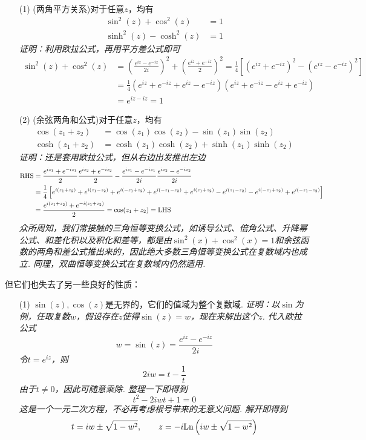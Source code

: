 \documentclass[UTF8]{ctexart}
\newcommand{\trm}[1]{{\rm #1}}
\begin{document}
\begin{itemize}
    \item [(1)] (两角平方关系)对于任意\(z\)，均有
    \begin{align*}
        \sin^2(z) + \cos^2(z) &= 1 \\
        \sinh^2(z) - \cosh^2(z) &= 1
    \end{align*}
    \textit{
        证明：利用欧拉公式，再用平方差公式即可
    }
    \begin{align*}
        \sin^2(z)+\cos^2(z) &= \left(\frac{e^{iz}-e^{-iz}}{2i}\right)^2+\left(\frac{e^{iz}+e^{-iz}}{2}\right)^2 = \frac{1}{4}\left[(e^{iz}+e^{-iz})^2-(e^{iz}-e^{-iz})^2\right] \\
        &= \frac{1}{4}(e^{iz}+e^{-iz}+e^{iz}-e^{-iz})(e^{iz}+e^{-iz}-e^{iz}+e^{-iz}) \\
        &= e^{iz-iz}=1
    \end{align*}
    \item [(2)] (余弦两角和公式)对于任意\(z\)，均有
    \begin{align*}
        \cos(z_1+z_2) &= \cos(z_1)\cos(z_2)-\sin(z_1)\sin(z_2) \\
        \cosh(z_1+z_2) &= \cosh(z_1)\cosh(z_2)+\sinh(z_1)\sinh(z_2)
    \end{align*}
    \textit{
        证明：还是套用欧拉公式，但从右边出发推出左边
    }
    \begin{align*}
        \textrm{RHS} &= \frac{e^{iz_1}+e^{-iz_1}}{2}\frac{e^{iz_2}+e^{-iz_2}}{2} - \frac{e^{iz_1}-e^{-iz_1}}{2i}\frac{e^{iz_2}-e^{-iz_2}}{2i} \\
        &= \frac{1}{4}\left[e^{i(z_1+z_2)}+e^{i(z_1-z_2)}+e^{i(-z_1+z_2)}+e^{i(-z_1-z_2)}+e^{i(z_1+z_2)}-e^{i(z_1-z_2)}-e^{i(-z_1+z_2)}+e^{i(-z_1-z_2)}\right] \\
        &= \frac{e^{i(z_1+z_2)}+e^{-i(z_1+z_2)}}{2} = \cos(z_1+z_2) = \trm{LHS}
    \end{align*}
    \textit{
        众所周知，我们常接触的三角恒等变换公式，如诱导公式、倍角公式、升降幂公式、和差化积以及积化和差等，都是由\(\sin^2(x)+\cos^2(x)=1\)和余弦函数的两角和差公式推出来的，因此绝大多数三角恒等变换公式在复数域内也成立. 同理，双曲恒等变换公式在复数域内仍然适用.
    }
\end{itemize}
但它们也失去了另一些良好的性质：
\begin{itemize}
    \item [(1)] \(\sin(z),\cos(z)\)是无界的，它们的值域为整个复数域.
    \newline
    \textit{
        证明：以\(\sin\)为例，任取复数\(w\)，假设存在\(z\)使得\(\sin(z)=w\)，现在来解出这个\(z\). 代入欧拉公式
        \[w=\sin(z)=\frac{e^{iz}-e^{-iz}}{2i}\]
        令\(t=e^{iz}\)，则
        \[2iw=t-\frac{1}{t}\]
        由于\(t\neq 0\)，因此可随意乘除. 整理一下即得到
        \[t^2-2iwt+1=0\]
        这是一个一元二次方程，不必再考虑根号带来的无意义问题. 解开即得到
        \[t=iw \pm \sqrt{1-w^2}, \qquad z=-i{\rm Ln}\left(iw \pm \sqrt{1-w^2}\right)\]
    }
\end{itemize}
\end{document}
